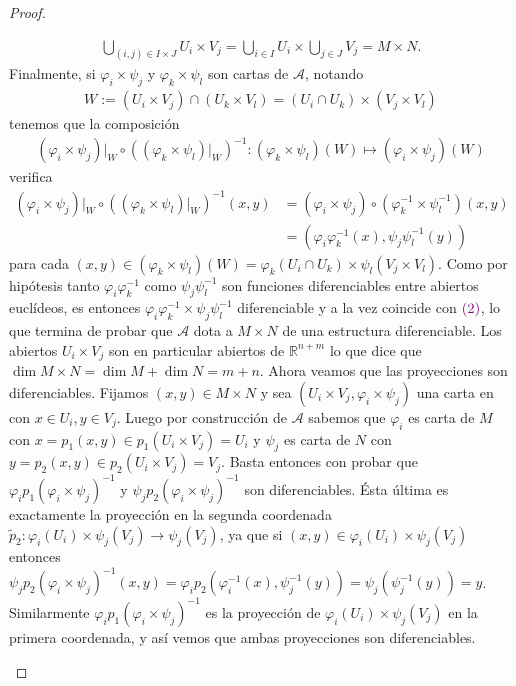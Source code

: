 \documentclass[11pt]{article}
\newcommand{\paint}[2]{\color{#1}{#2}}
\begin{document}
\begin{proof}
\begin{itemize}
\begin{align*}
\bigcup_{(i,j) \in I \times J} U_i \times V_j = \bigcup_{i \in I} U_i \times \bigcup_{j \in J} V_j = M \times N.
\end{align*}
Finalmente, si $\varphi_i \times \psi_j$  y $\varphi_k \times \psi_l$ son cartas de $\mathcal{A}$, notando
\begin{align*}
W := (U_i \times V_j) \cap (U_k \times V_l) = (U_i \cap U_k) \times (V_j \times V_l)
\end{align*}
tenemos que la composici\'on 
\begin{align}
(\varphi_i \times \psi_j)|_W \circ ((\varphi_k \times \psi_l)|_W)^{-1} : (\varphi_k \times \psi_l)(W) \mapsto (\varphi_i \times \psi_j)(W)
\end{align}
verifica
\begin{align*}
(\varphi_i \times \psi_j)|_W \circ ((\varphi_k \times \psi_l)|_W)^{-1}(x,y) & = (\varphi_i \times \psi_j) \circ (\varphi^{-1}_k \times \psi^{-1}_l) (x,y)\\
& =(\varphi_i\varphi^{-1}_k(x), \psi_j\psi^{-1}_l(y))
\end{align*}
para cada $(x,y) \in (\varphi_k \times \psi_l)(W) = \varphi_k(U_i \cap U_k) \times \psi_l(V_j \times V_l)$. Como por hip\'otesis tanto $\varphi_i\varphi^{-1}_k$ como $\psi_j\psi^{-1}_l$ son funciones diferenciables entre abiertos eucl\'ideos, es entonces $\varphi_i\varphi^{-1}_k \times \psi_j\psi^{-1}_l$ diferenciable y a la vez coincide con $\paint{purple}{(2)}$, lo que termina de probar que $\mathcal{A}$ dota a $M \times N$ de una estructura diferenciable. Los abiertos $U_i \times V_j$ son en particular abiertos de $\mathbb{R}^{n+m}$ lo que dice que $\dim M \times N = \dim M + \dim N = m+n$. Ahora veamos que las proyecciones son diferenciables. Fijamos $(x,y) \in M \times N$ y sea $(U_i \times V_j, \varphi_i  \times \psi_j)$ una carta en con $x \in U_i, y \in V_j$. Luego por construcci\'on de $\mathcal{A}$ sabemos que $\varphi_i$ es carta de $M$ con $x = p_1(x,y) \in p_1(U_i \times V_j) = U_i$ y $\psi_j$ es carta de $N$ con $y = p_2(x,y) \in p_2(U_i \times V_j) = V_j$. Basta entonces con probar que $\varphi_i p_1 (\varphi_i \times \psi_j)^{-1}$ y $\psi_j p_2 (\varphi_i \times \psi_j)^{-1}$ son diferenciables. \'Esta \'ultima es exactamente la proyecci\'on en la segunda coordenada $\tilde{p}_2 : \varphi_i(U_i) \times \psi_j(V_j) \to \psi_j(V_j)$, ya que si $(x,y) \in \varphi_i(U_i) \times \psi_j(V_j)$ entonces $\psi_j p_2 (\varphi_i \times \psi_j)^{-1}(x,y) = \varphi_i p_2 (\varphi_i^{-1}(x),\psi^{-1}_j(y)) = \psi_j(\psi^{-1}_j(y)) = y$. Similarmente $\varphi_i p_1 (\varphi_i \times \psi_j)^{-1}$ es la proyecci\'on de $\varphi_i(U_i) \times \psi_j(V_j)$ en la primera coordenada, y as\'i vemos que ambas proyecciones son diferenciables.

\end{itemize}
\end{proof}
\end{document}
